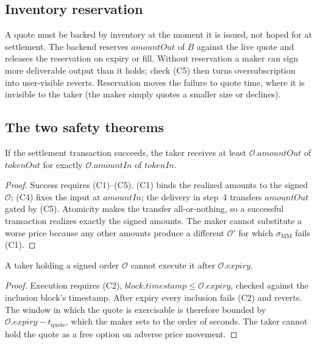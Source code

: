 \subsection{Inventory reservation}
\label{sec:rfq-inv}

A quote must be backed by inventory at the moment it is issued, not
hoped for at settlement. The backend reserves $\mathit{amountOut}$ of
$B$ against the live quote and releases the reservation on expiry or
fill. Without reservation a maker can sign more deliverable output than
it holds; check (C5) then turns oversubscription into user-visible
reverts. Reservation moves the failure to quote time, where it is
invisible to the taker (the maker simply quotes a smaller size or
declines).

\subsection{The two safety theorems}

\begin{theorem}
\label{thm:integrity}
If the settlement transaction succeeds, the taker receives at least
$\mathcal{O}.\mathit{amountOut}$ of $\mathit{tokenOut}$ for exactly
$\mathcal{O}.\mathit{amountIn}$ of $\mathit{tokenIn}$.
\end{theorem}
\begin{proof}
Success requires (C1)--(C5). (C1) binds the realized amounts to the
signed $\mathcal{O}$; (C4) fixes the input at $\mathit{amountIn}$; the
delivery in step~4 transfers $\mathit{amountOut}$ gated by (C5).
Atomicity makes the transfer all-or-nothing, so a successful
transaction realizes exactly the signed amounts. The maker cannot
substitute a worse price because any other amounts produce a different
$\mathcal{O}'$ for which $\sigma_{\mathrm{MM}}$ fails (C1).
\end{proof}

\begin{theorem}
\label{thm:nooption}
A taker holding a signed order $\mathcal{O}$ cannot execute it after
$\mathcal{O}.\mathit{expiry}$.
\end{theorem}
\begin{proof}
Execution requires (C2), $\mathit{block.timestamp} \le
\mathcal{O}.\mathit{expiry}$, checked against the inclusion block's
timestamp. After expiry every inclusion fails (C2) and reverts. The
window in which the quote is exercisable is therefore bounded by
$\mathcal{O}.\mathit{expiry} - t_{\mathrm{quote}}$, which the maker sets
to the order of seconds. The taker cannot hold the quote as a
free option on adverse price movement.
\end{proof}

